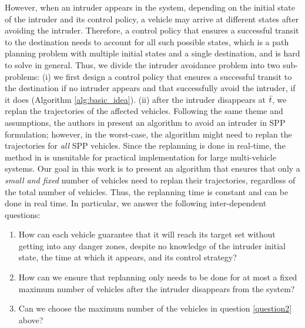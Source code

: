 However, when an intruder appears in the system, depending on the initial state of the intruder and its control policy, a vehicle may arrive at different states after avoiding the intruder. Therefore, a control policy that ensures a successful transit to the destination needs to account for all such possible states, which is a path planning problem with multiple initial states and a single destination, and is hard to solve in general. Thus, we divide the intruder avoidance problem into two sub-problems: (i) we first design a control policy that ensures a successful transit to the destination if no intruder appears and that successfully avoid the intruder, if it does (Algorithm \ref{alg:basic_idea}). (ii) after the intruder disappears at $\bar{t}$, we replan the trajectories of the affected vehicles. Following the same theme and assumptions, the authors in \cite{chen2016robust} present an algorithm to avoid an intruder in SPP formulation; however, in the worst-case, the algorithm might need to replan the trajectories for \textit{all} SPP vehicles. Since the replanning is done in real-time, the method in \cite{chen2016robust} is unsuitable for practical implementation for large multi-vehicle systems. Our goal in this work is to present an algorithm that ensures that only a \textit{small and fixed} number of vehicles need to replan their trajectories, regardless of the total number of vehicles. Thus, the replanning time is constant and can be done in real time. In particular, we answer the following inter-dependent questions:
\begin{enumerate}
\item How can each vehicle guarantee that it will reach its target set without getting into any danger zones, despite no knowledge of the intruder initial state, the time at which it appears, and its control strategy?
\item How can we ensure that replanning only needs to be done for at most a fixed maximum number of vehicles after the intruder disappears from the system? \label{question2}
\item Can we choose the maximum number of the vehicles in question \ref{question2} above?
\end{enumerate}


